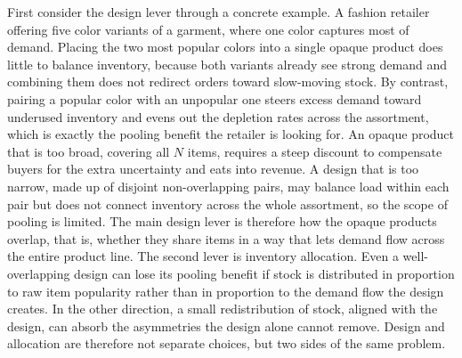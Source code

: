 First consider the design lever through a concrete example.
A fashion retailer offering five color variants of a garment, where one color captures most of demand.
Placing the two most popular colors into a single opaque product does little to balance inventory, because both variants already see strong demand and combining them does not redirect orders toward slow-moving stock.
By contrast, pairing a popular color with an unpopular one steers excess demand toward underused inventory and evens out the depletion rates across the assortment, which is exactly the pooling benefit the retailer is looking for.
An opaque product that is too broad, covering all $N$ items, requires a steep discount to compensate buyers for the extra uncertainty and eats into revenue.
A design that is too narrow, made up of disjoint non-overlapping pairs, may balance load within each pair but does not connect inventory across the whole assortment, so the scope of pooling is limited.
The main design lever is therefore how the opaque products overlap, that is, whether they share items in a way that lets demand flow across the entire product line.
The second lever is inventory allocation.
Even a well-overlapping design can lose its pooling benefit if stock is distributed in proportion to raw item popularity rather than in proportion to the demand flow the design creates.
In the other direction, a small redistribution of stock, aligned with the design, can absorb the asymmetries the design alone cannot remove.
Design and allocation are therefore not separate choices, but two sides of the same problem.

